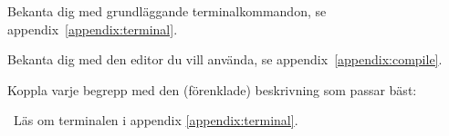 

\ifPreSolution

\Exercise{\ExeWeekTWO}\label{exe:W02}
\begin{Goals}

\end{Goals}

\begin{Preparations}
\item {}
\item Bekanta dig med grundläggande terminalkommandon, se appendix~\ref{appendix:terminal}.
\item Bekanta dig med den editor du vill använda, se appendix~\ref{appendix:compile}.
\end{Preparations}

\else

\ExerciseSolution{\ExeWeekTWO}

\fi





\BasicTasksNoLab %





\QUESTBEGIN

\Task \what

\vspace{1em}\noindent Koppla varje begrepp med den (förenklade) beskrivning som passar bäst:

\begin{ConceptConnections}

\end{ConceptConnections}

\SOLUTION

\TaskSolved \what

\begin{ConceptConnections}

\end{ConceptConnections}

\QUESTEND






\QUESTBEGIN

\Task \what~Läs om terminalen i appendix \ref{appendix:terminal}.

